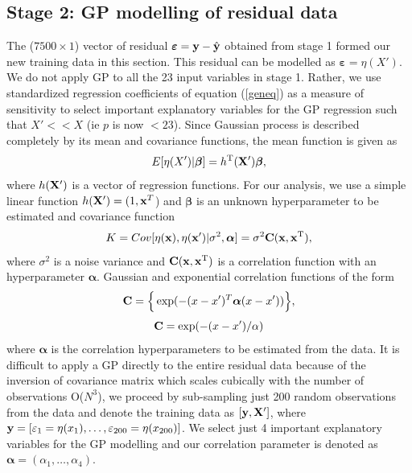 \documentclass[12pt,titlepage]{report}
\newcommand{\bC}{{\bf C}}
\newcommand{\bx}{{\bf x}}
\newcommand{\bX}{{\bf X}}
\newcommand{\by}{{\bf y}}
\newcommand{\hby}{{\hat {\bf y}}}
\theoremstyle{definition}
\theoremstyle{remark}
\begin{document}
\subsection{Stage 2: GP modelling of residual data}\label{GP}
The (${7500\times 1}$) vector of residual $\boldsymbol \varepsilon=\by-\hby$ obtained from stage 1 formed our new training data in this section. This residual can be modelled as $\boldsymbol \varepsilon= \eta(X')$. We do not apply GP to all the 23 input variables in stage 1. Rather, we use standardized regression coefficients of equation (\ref{geneq}) as a measure of sensitivity to select important explanatory variables for the GP regression such that $X'<< X$ (ie $p$ is now $<23$).
Since Gaussian process is described completely by its mean and covariance functions, the mean function is given as
\begin{equation}\label{eqgp3}
E[\eta(X')|\boldsymbol\beta]=h^{\rm T}(\bX')\boldsymbol\beta,
\end{equation}
where $h(\bX')$ is a vector of regression functions. For our analysis, we use a simple linear function $h(\bX') = (1,\bx^T$) and $\boldsymbol\beta$ is an unknown hyperparameter to be estimated and covariance function $$ K={Cov[\eta(\bx),\eta(\bx')|\sigma^{2},\boldsymbol \alpha]=\sigma^{2} \bC(\bx,\bx^{\rm T})},$$ where $\sigma^{2}$ is a noise variance and $\bC(\bx,\bx^{\rm T})$ is a correlation function with an hyperparameter $\boldsymbol \alpha$. Gaussian and exponential correlation functions of the form
\begin{equation}\label{gaus}
\bC=\Big \{\exp(-(x-x')^T \boldsymbol \alpha (x-x')) \Big\},%
\end{equation}
\begin{equation}\label{expo}
\bC= \exp(-(x-x')/\alpha)
\end{equation}
where $\boldsymbol \alpha$ is the correlation hyperparameters to be estimated from the data. It is difficult to apply a GP directly to the entire residual data because of the inversion of covariance matrix which scales cubically with the number of
observations O($N^3$), we proceed by sub-sampling just 200 random observations from the data and denote the training data as $[\by, \bX']$, where $\by=[ \varepsilon_1= \eta(x_1),\ldots, \varepsilon_{200}= \eta(x_{200})]$. We select just 4 important explanatory variables for the GP modelling and our correlation parameter is denoted as $\boldsymbol \alpha=(\alpha_1,\ldots,\alpha_4)$.
\end{document}
